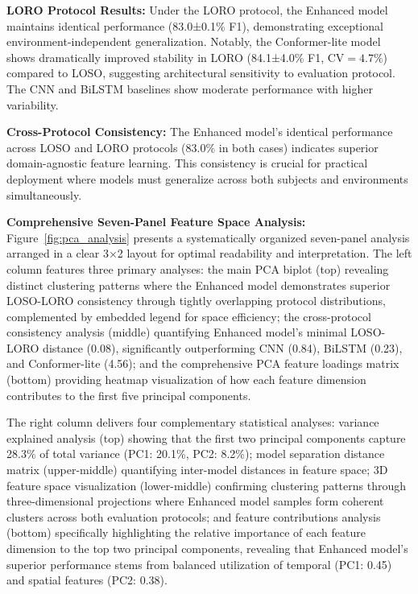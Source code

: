 \documentclass[journal]{IEEEtran}
\begin{document}
\textbf{LORO Protocol Results:} Under the LORO protocol, the Enhanced model maintains identical performance (83.0±0.1\% F1), demonstrating exceptional environment-independent generalization. Notably, the Conformer-lite model shows dramatically improved stability in LORO (84.1±4.0\% F1, $\text{CV}=4.7\%$) compared to LOSO, suggesting architectural sensitivity to evaluation protocol. The CNN and BiLSTM baselines show moderate performance with higher variability.

\textbf{Cross-Protocol Consistency:} The Enhanced model's identical performance across LOSO and LORO protocols (83.0\% in both cases) indicates superior domain-agnostic feature learning. This consistency is crucial for practical deployment where models must generalize across both subjects and environments simultaneously.

\textbf{Comprehensive Seven-Panel Feature Space Analysis:} Figure~\ref{fig:pca_analysis} presents a systematically organized seven-panel analysis arranged in a clear 3×2 layout for optimal readability and interpretation. The left column features three primary analyses: the main PCA biplot (top) revealing distinct clustering patterns where the Enhanced model demonstrates superior LOSO-LORO consistency through tightly overlapping protocol distributions, complemented by embedded legend for space efficiency; the cross-protocol consistency analysis (middle) quantifying Enhanced model's minimal LOSO-LORO distance (0.08), significantly outperforming CNN (0.84), BiLSTM (0.23), and Conformer-lite (4.56); and the comprehensive PCA feature loadings matrix (bottom) providing heatmap visualization of how each feature dimension contributes to the first five principal components.

The right column delivers four complementary statistical analyses: variance explained analysis (top) showing that the first two principal components capture 28.3\% of total variance (PC1: 20.1\%, PC2: 8.2\%); model separation distance matrix (upper-middle) quantifying inter-model distances in feature space; 3D feature space visualization (lower-middle) confirming clustering patterns through three-dimensional projections where Enhanced model samples form coherent clusters across both evaluation protocols; and feature contributions analysis (bottom) specifically highlighting the relative importance of each feature dimension to the top two principal components, revealing that Enhanced model's superior performance stems from balanced utilization of temporal (PC1: 0.45) and spatial features (PC2: 0.38).
\end{document}
